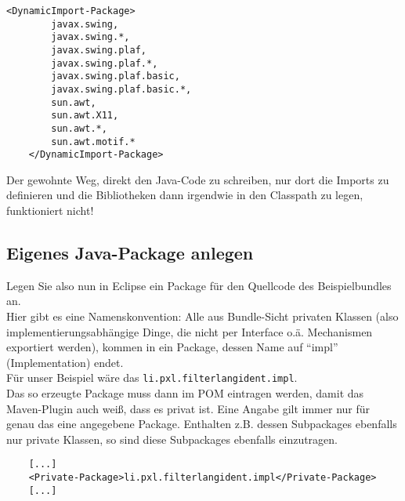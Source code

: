 \documentclass[a4paper,12pt]{scrartcl}
\begin{document}
\begin{lstlisting}[caption=\lstinline|DynamicImport|-Beispiel aus dem DesktopIntegration-Bundle]
	<DynamicImport-Package>
		javax.swing, 
		javax.swing.*,
		javax.swing.plaf,
		javax.swing.plaf.*,
		javax.swing.plaf.basic,
		javax.swing.plaf.basic.*,
		sun.awt,
		sun.awt.X11,
		sun.awt.*,
		sun.awt.motif.*
	</DynamicImport-Package>
\end{lstlisting}
Der gewohnte Weg, direkt den Java-Code zu schreiben, nur dort die Imports zu definieren und die Bibliotheken dann irgendwie in den Classpath zu legen, funktioniert nicht!

\subsection{Eigenes Java-Package anlegen}
Legen Sie also nun in Eclipse ein Package für den Quellcode des Beispielbundles an.\\
Hier gibt es eine Namenskonvention: Alle aus Bundle-Sicht privaten Klassen (also implementierungsabhängige Dinge, die nicht per Interface o.ä. Mechanismen exportiert werden), kommen in ein Package, dessen Name auf "`impl"' (Implementation) endet.\\
Für unser Beispiel wäre das \lstinline[breaklines=false, basicstyle=\itshape]|li.pxl.filterlangident.impl|.\\
Das so erzeugte Package muss dann im POM eintragen werden, damit das Maven-Plugin auch weiß, dass es privat ist. Eine Angabe gilt immer nur für genau das eine angegebene Package. Enthalten z.B. dessen Subpackages ebenfalls nur private Klassen, so sind diese Subpackages ebenfalls einzutragen.
\begin{lstlisting}
	[...]
	<Private-Package>li.pxl.filterlangident.impl</Private-Package>
	[...]
\end{lstlisting}
\end{document}

